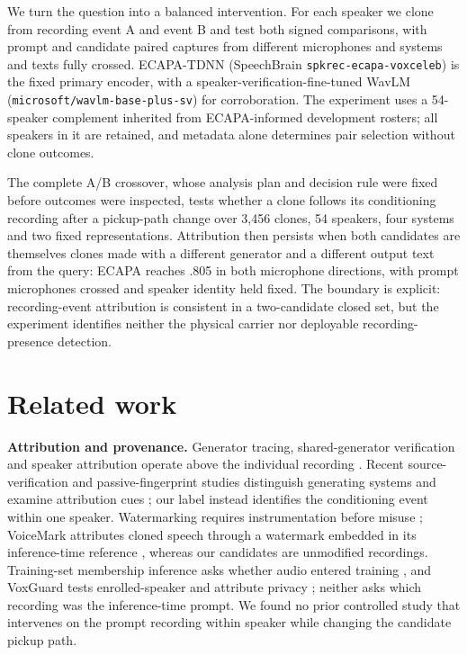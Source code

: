 \documentclass[10pt,twocolumn,letterpaper]{article}
\begin{document}
We turn the question into a balanced intervention. For each speaker we clone
from recording event A and event B and test both signed comparisons, with
prompt and candidate paired captures from different microphones and systems and
texts fully crossed. ECAPA-TDNN \cite{ecapa} (SpeechBrain
\texttt{spkrec-ecapa-voxceleb}) is the fixed primary encoder, with a
speaker-verification-fine-tuned WavLM \cite{wavlm}
(\texttt{microsoft/wavlm-base-plus-sv}) for corroboration. The experiment uses
a 54-speaker complement inherited from ECAPA-informed development rosters; all
speakers in it are retained, and metadata alone determines pair selection
without clone outcomes.

The complete A/B crossover, whose analysis plan and decision rule were fixed
before outcomes were inspected, tests whether a clone follows its conditioning
recording after a pickup-path change over 3,456 clones, 54 speakers, four
systems and two fixed representations. Attribution then persists when both
candidates are themselves clones made with a different generator and a
different output text from the query: ECAPA reaches .805 in both microphone
directions, with prompt microphones crossed and speaker identity held fixed.
The boundary is explicit: recording-event attribution is consistent in a
two-candidate closed set, but the experiment identifies neither the physical
carrier nor deployable recording-presence detection.

\section{Related work}
\textbf{Attribution and provenance.} Generator tracing, shared-generator
verification and speaker attribution operate above the individual recording
\cite{stopa,negroni2026forensic,kato2026floor,avatar2026}. Recent
source-verification and passive-fingerprint studies distinguish generating
systems and examine attribution cues \cite{falez2025,negroni2025source,li2026fingerprints};
our label instead identifies the conditioning event within one speaker.
Watermarking requires
instrumentation before misuse \cite{vocalock}; VoiceMark attributes cloned
speech through a watermark embedded in its inference-time reference
\cite{voicemark}, whereas our candidates are unmodified recordings. Training-set
membership inference asks whether audio entered training \cite{flowleak2026}, and VoxGuard
tests enrolled-speaker and attribute privacy \cite{voxguard2026}; neither asks
which recording was the inference-time prompt. We found no prior controlled study that intervenes on
the prompt recording within speaker while changing the candidate pickup path.
\end{document}
